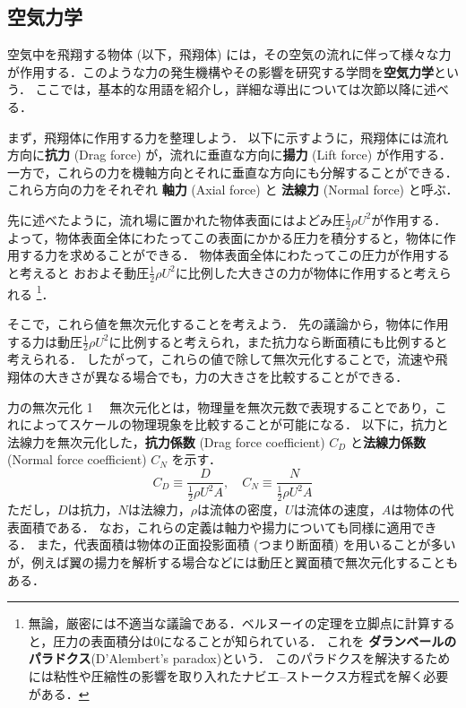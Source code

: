 \documentclass[uplatex,dvipdfmx,a4j,11pt]{jsreport}
\newcommand{\keyword}[1]{\textcolor{mainblue}{\textbf{#1}}}
\numberwithin{equation}{chapter}
\begin{document}
\subsection{空気力学}
空気中を飛翔する物体 (以下，飛翔体) には，その空気の流れに伴って様々な力が作用する．このような力の発生機構やその影響を研究する学問を\keyword{空気力学}という．
ここでは，基本的な用語を紹介し，詳細な導出については次節以降に述べる．

\enskip

まず，飛翔体に作用する力を整理しよう．
以下に示すように，飛翔体には流れ方向に\keyword{抗力} (Drag force) が，流れに垂直な方向に\keyword{揚力} (Lift force) が作用する．
一方で，これらの力を機軸方向とそれに垂直な方向にも分解することができる．
これら方向の力をそれぞれ \keyword{軸力} (Axial force) と \keyword{法線力} (Normal force) と呼ぶ．


先に述べたように，流れ場に置かれた物体表面にはよどみ圧$\frac{1}{2}\rho U^{2}$が作用する．
よって，物体表面全体にわたってこの表面にかかる圧力を積分すると，物体に作用する力を求めることができる．
物体表面全体にわたってこの圧力が作用すると考えると
おおよそ動圧$\frac{1}{2}\rho U^{2}$に比例した大きさの力が物体に作用すると考えられる
\footnote{
  無論，厳密には不適当な議論である．ベルヌーイの定理を立脚点に計算すると，圧力の表面積分は0になることが知られている．
  これを \keyword{ダランベールのパラドクス}(D'Alembert's paradox)という．
  このパラドクスを解決するためには粘性や圧縮性の影響を取り入れたナビエ--ストークス方程式を解く必要がある．
}．

そこで，これら値を無次元化することを考えよう．
先の議論から，物体に作用する力は動圧$\frac{1}{2}\rho U^{2}$に比例すると考えられ，また抗力なら断面積にも比例すると考えられる．
したがって，これらの値で除して無次元化することで，流速や飛翔体の大きさが異なる場合でも，力の大きさを比較することができる．
\begin{definition}{力の無次元化 1}{}{}
  　無次元化とは，物理量を無次元数で表現することであり，これによってスケールの物理現象を比較することが可能になる．
  以下に，抗力と法線力を無次元化した，\keyword{抗力係数} (Drag force coefficient) $C_{D}$ と\keyword{法線力係数} (Normal force coefficient) $C_{N}$ を示す．
    \begin{equation}
      C_{D} \equiv \frac{D}{\frac{1}{2}\rho U^{2}A}, \quad C_{N} \equiv \frac{N}{\frac{1}{2}\rho U^{2}A}
    \end{equation}
  ただし，$D$は抗力，$N$は法線力，$\rho$は流体の密度，$U$は流体の速度，$A$は物体の代表面積である．
  なお，これらの定義は軸力や揚力についても同様に適用できる．
  また，代表面積は物体の正面投影面積 (つまり断面積) を用いることが多いが，例えば翼の揚力を解析する場合などには動圧と翼面積で無次元化することもある．
\end{definition}
\end{document}

